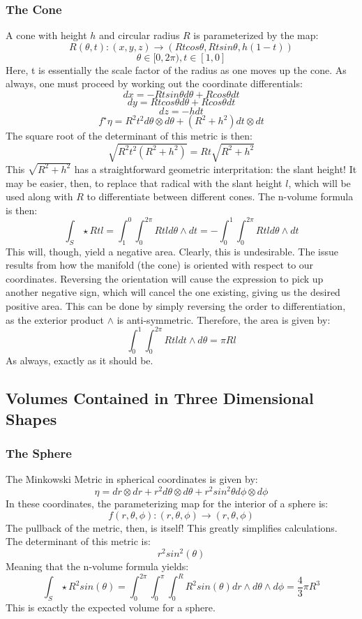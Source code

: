 \documentclass{article}
\begin{document}
\subsubsection{The Cone}
A cone with height $h$ and circular radius $R$ is parameterized by the map:
\[
R(\theta,t): (x,y,z) \rightarrow (Rt cos\theta, Rt sin\theta, h(1-t))
\]
\[
\theta \in [0, 2\pi), t \in [1, 0]
\]
Here, t is essentially the scale factor of the radius as one moves up the cone. As always, one must proceed by working out the coordinate differentials:
\[
dx = -Rt sin\theta d\theta + R cos\theta dt
\]
\[
dy = Rt cos\theta d\theta + R cos\theta dt
\]
\[
dz = -hdt
\]
\[
f^{\star}\eta = R^2 t^2 d\theta \otimes d\theta + (R^2 + h^2) dt \otimes dt
\]
The square root of the determinant of this metric is then:
\[
\sqrt{R^2t^2(R^2+h^2)} = Rt\sqrt{R^2+h^2}
\]
This $\sqrt{R^2+h^2}$ has a straightforward geometric interpritation: the slant height! It may be easier, then, to replace that radical with the slant height $l$, which will be used along with $R$ to differentiate between different cones. The n-volume formula is then:
\[
\int_S \star Rtl = \int_1^0\int_0^{2\pi} Rtl d\theta \wedge dt = -\int_0^1\int_0^{2\pi} Rtl d\theta \wedge dt
\]
This will, though, yield a negative area. Clearly, this is undesirable. The issue results from how the manifold (the cone) is oriented with respect to our coordinates. Reversing the orientation will cause the expression to pick up another negative sign, which will cancel the one existing, giving us the desired positive area. This can be done by simply reversing the order to differentiation, as the exterior product $\wedge$ is anti-symmetric. Therefore, the area is given by:
\[
\int_0^1\int_0^{2\pi} Rtl dt \wedge d\theta = \pi Rl
\]
As always, exactly as it should be.

\subsection{Volumes Contained in Three Dimensional Shapes}
\subsubsection{The Sphere}
The Minkowski Metric in spherical coordinates is given by:
\[
\eta = dr \otimes dr + r^2 d\theta \otimes d\theta + r^2 sin^2\theta d\phi \otimes d\phi
\]
In these coordinates, the parameterizing map for the interior of a sphere is:
\[
f(r, \theta, \phi):(r,\theta, \phi) \rightarrow (r, \theta, \phi)
\]
The pullback of the metric, then, is itself! This greatly simplifies calculations. The determinant of this metric is:
\[
r^2 sin^2 (\theta)
\]
Meaning that the n-volume formula yields:
\[
\int_S \star R^2 sin(\theta) = \int_{0}^{2\pi}\int_{0}^{\pi}\int_{0}^{R}R^2 sin(\theta) dr \wedge d\theta \wedge d\phi = \frac{4}{3}\pi R^3
\]
This is exactly the expected volume for a sphere.
\end{document}
